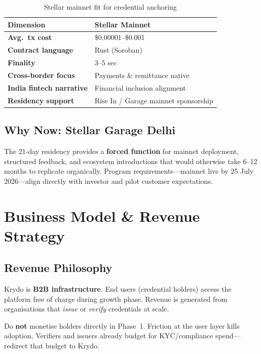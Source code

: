 \documentclass[11pt,a4paper]{article}
\newcommand{\krydo}{\textsf{Krydo}}
\newcommand{\stellar}{\textsf{Stellar}}
\newcommand{\soroban}{\textsf{Soroban}}
\begin{document}
\begin{table}[H]
  \centering
  \caption{\stellar{} mainnet fit for credential anchoring}
  \renewcommand{\arraystretch}{1.25}
  \begin{tabularx}{\textwidth}{@{}>{\bfseries}p{3.5cm} X@{}}
    \toprule
    Dimension & \stellar{} Mainnet \\
    \midrule
    Avg.\ tx cost & \$0.00001--\$0.001 \\
    Contract language & Rust (\soroban{}) \\
    Finality & 3--5 sec \\
    Cross-border focus & Payments \& remittance native \\
    India fintech narrative & Financial inclusion alignment \\
    Residency support & Rise In / Garage mainnet sponsorship \\
    \bottomrule
  \end{tabularx}
\end{table}

\subsection{Why Now: \stellar{} Garage Delhi}

The 21-day residency provides a \textbf{forced function} for mainnet deployment, structured feedback, and ecosystem introductions that would otherwise take 6--12 months to replicate organically. Program requirements---mainnet live by 25 July 2026---align directly with investor and pilot customer expectations.

\section{Business Model \& Revenue Strategy}

\subsection{Revenue Philosophy}

\krydo{} is \textbf{B2B infrastructure}. End users (credential holders) access the platform free of charge during growth phase. Revenue is generated from organisations that \emph{issue} or \emph{verify} credentials at scale.

\begin{warningbox}
  Do \textbf{not} monetise holders directly in Phase~1. Friction at the user layer kills adoption. Verifiers and issuers already budget for KYC/compliance spend---redirect that budget to \krydo{}.
\end{warningbox}
\end{document}
